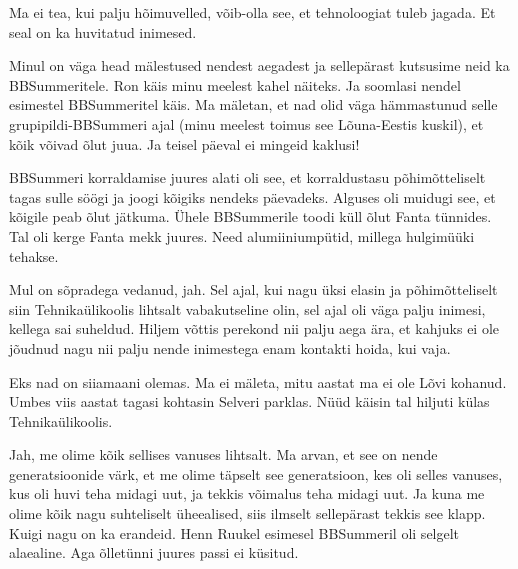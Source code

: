 
Ma ei tea, kui palju hõimuvelled, võib-olla see, et tehnoloogiat tuleb jagada. Et seal on ka huvitatud inimesed. 

Minul on väga head mälestused nendest aegadest ja sellepärast kutsusime neid ka  BBSummeritele. Ron käis minu meelest kahel näiteks. Ja soomlasi nendel esimestel BBSummeritel käis. Ma mäletan, et nad olid väga hämmastunud selle grupipildi-BBSummeri ajal (minu meelest toimus see Lõuna-Eestis kuskil), et kõik võivad õlut juua. Ja teisel päeval ei mingeid kaklusi!

BBSummeri korraldamise juures alati oli see, et korraldustasu  põhimõtteliselt tagas sulle söögi ja joogi kõigiks nendeks päevadeks. Alguses oli muidugi see, et kõigile peab õlut jätkuma. Ühele BBSummerile toodi küll õlut Fanta tünnides. Tal oli kerge Fanta mekk juures. Need alumiiniumpütid, millega hulgimüüki tehakse. 


Mul on sõpradega vedanud, jah. Sel ajal, kui  nagu üksi elasin ja põhimõtteliselt siin Tehnikaülikoolis lihtsalt vabakutseline olin, sel ajal oli väga palju inimesi, kellega sai suheldud. Hiljem võttis perekond nii palju aega ära, et kahjuks ei ole jõudnud nagu nii palju nende inimestega enam kontakti hoida, kui vaja.


Eks nad on siiamaani olemas. Ma ei mäleta, mitu aastat ma ei ole Lõvi kohanud. Umbes viis aastat tagasi kohtasin Selveri parklas. Nüüd käisin tal hiljuti külas Tehnikaülikoolis.


Jah, me olime kõik sellises vanuses lihtsalt. Ma arvan, et see on nende generatsioonide värk, et me olime täpselt see generatsioon, kes oli selles vanuses, kus oli huvi teha midagi uut, ja tekkis võimalus teha midagi uut. Ja kuna me olime kõik nagu suhteliselt üheealised, siis ilmselt sellepärast tekkis see klapp. Kuigi nagu on ka erandeid. Henn Ruukel esimesel BBSummeril oli selgelt alaealine. Aga õlletünni juures passi ei küsitud.

